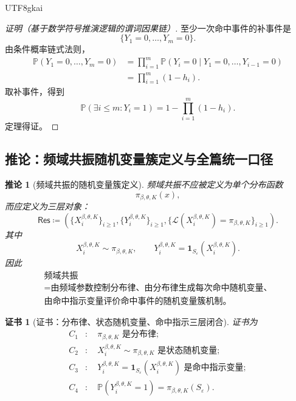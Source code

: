 \documentclass[12pt]{article}
\newtheorem{corollary}{推论}[section]
\newtheorem{Certificate}{证书}[section]
\newcommand{\DefEq}{\coloneqq}
\begin{document}
\begin{CJK*}{UTF8}{gkai}
\begin{proof}[证明（基于数学符号推演逻辑的谓词因果链）]
至少一次命中事件的补事件是
\[
  \{Y_1=0,\ldots,Y_m=0\}.
\]
由条件概率链式法则，
\[
\begin{aligned}
  \mathbb P(Y_1=0,\ldots,Y_m=0)
  &=
  \prod_{i=1}^{m}
  \mathbb P(Y_i=0\mid Y_1=0,\ldots,Y_{i-1}=0)\\
  &=
  \prod_{i=1}^{m}(1-h_i).
\end{aligned}
\]
取补事件，得到
\[
  \mathbb P(\exists i\le m:Y_i=1)
  =
  1-\prod_{i=1}^{m}(1-h_i).
\]
定理得证。
\end{proof}

\subsection{推论：频域共振随机变量簇定义与全篇统一口径}
\label{subsec:tex55-resonance-correction-corollary}

\begin{corollary}[频域共振的随机变量簇定义]
\label{cor:tex55-resonance-corrected-definition}
频域共振不应被定义为单个分布函数
\[
  \pi_{\beta,\theta,K}(x),
\]
而应定义为三层对象：
\[
  \boxed{
  \mathsf{Res}
  \DefEq
  \left(
  \{X_i^{\beta,\theta,K}\}_{i\ge1},
  \{Y_i^{\beta,\theta,K}\}_{i\ge1},
  \{\mathcal L(X_i^{\beta,\theta,K})=\pi_{\beta,\theta,K}\}_{i\ge1}
  \right).
  }
\]
其中
\[
  X_i^{\beta,\theta,K}\sim\pi_{\beta,\theta,K},
  \qquad
  Y_i^{\beta,\theta,K}
  =
  \mathbf 1_{S_\varepsilon}(X_i^{\beta,\theta,K}).
\]
因此
\[
  \boxed{
  \begin{gathered}
  \text{频域共振}\\
  =
  \text{由频域参数控制分布律、由分布律生成每次命中随机变量、}\\
  \text{由命中指示变量评价命中事件的随机变量簇机制。}
  \end{gathered}
  }
\]
\end{corollary}

\begin{Certificate}[证书：分布律、状态随机变量、命中指示三层闭合]
\label{cert:tex55-resonance-corrected-definition}
证书为
\[
\begin{aligned}
  C_1&:\quad \pi_{\beta,\theta,K}\text{ 是分布律};\\
  C_2&:\quad X_i^{\beta,\theta,K}\sim\pi_{\beta,\theta,K}\text{ 是状态随机变量};\\
  C_3&:\quad Y_i^{\beta,\theta,K}=\mathbf 1_{S_\varepsilon}(X_i^{\beta,\theta,K})\text{ 是命中指示变量};\\
  C_4&:\quad
  \mathbb P(Y_i^{\beta,\theta,K}=1)=\pi_{\beta,\theta,K}(S_\varepsilon).
\end{aligned}
\]
\end{Certificate}


\end{CJK*}
\end{document}
